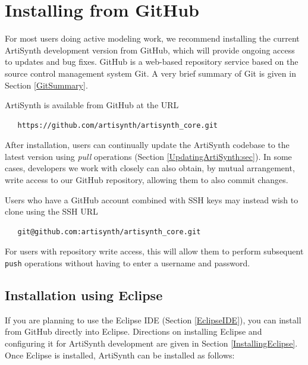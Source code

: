 \section{Installing from GitHub}
\label{GitHubInstall}

For most users doing active modeling work, we recommend installing the
current ArtiSynth development version from GitHub, which will provide
ongoing access to updates and bug fixes.  GitHub is a web-based
repository service based on the source control management system
Git. A very brief summary of Git is given in Section \ref{GitSummary}.

ArtiSynth is available from GitHub at the URL
\begin{verbatim}
   https://github.com/artisynth/artisynth_core.git
\end{verbatim}
After installation, users can continually update the ArtiSynth
codebase to the latest version using {\it pull} operations
(Section \ref{UpdatingArtiSynth:sec}).  In some cases, developers we work
with closely can also obtain, by mutual arrangement, write access to
our GitHub repository, allowing them to also commit changes.

\begin{sideblock}
Users who have a GitHub account combined with SSH keys may instead
wish to clone using the SSH URL
\begin{verbatim}
   git@github.com:artisynth/artisynth_core.git
\end{verbatim}
For users with repository write access, this will allow them to
perform subsequent {\tt push} operations without having to
enter a username and password.
\end{sideblock}

\subsection{Installation using Eclipse}
\label{EclipseInstallation}

If you are planning to use the Eclipse IDE (Section \ref{EclipseIDE}),
you can install from GitHub directly into Eclipse.  Directions on
installing Eclipse and configuring it for ArtiSynth development are
given in Section
\ref{InstallingEclipse}.
Once Eclipse is installed, ArtiSynth can be installed
as follows:

